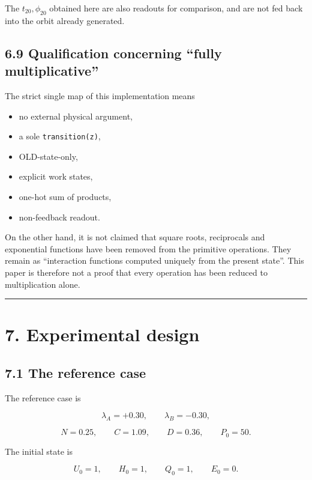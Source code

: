 \documentclass[
  a4paper,
]{article}
\providecommand{\tightlist}{%
  \setlength{\itemsep}{0pt}\setlength{\parskip}{0pt}}
\begin{document}
The \(t_{20},\phi_{20}\) obtained here are also readouts for comparison,
and are not fed back into the orbit already generated.

\subsection{6.9 Qualification concerning ``fully
multiplicative''}\label{qualification-concerning-fully-multiplicative}

The strict single map of this implementation means

\begin{itemize}
\tightlist
\item
  no external physical argument,
\item
  a sole \texttt{transition(z)},
\item
  OLD-state-only,
\item
  explicit work states,
\item
  one-hot sum of products,
\item
  non-feedback readout.
\end{itemize}

On the other hand, it is not claimed that square roots, reciprocals and
exponential functions have been removed from the primitive operations.
They remain as ``interaction functions computed uniquely from the
present state''. This paper is therefore not a proof that every
operation has been reduced to multiplication alone.

\begin{center}\rule{0.5\linewidth}{0.5pt}\end{center}

\section{7. Experimental design}\label{experimental-design}

\subsection{7.1 The reference case}\label{the-reference-case}

The reference case is

\[
\lambda_A=+0.30,
\qquad
\lambda_B=-0.30,
\]

\[
N=0.25,
\qquad
C=1.09,
\qquad
D=0.36,
\qquad
P_0=50.
\]

The initial state is

\[
U_0=1,
\qquad
H_0=1,
\qquad
Q_0=1,
\qquad
E_0=0.
\]
\end{document}

